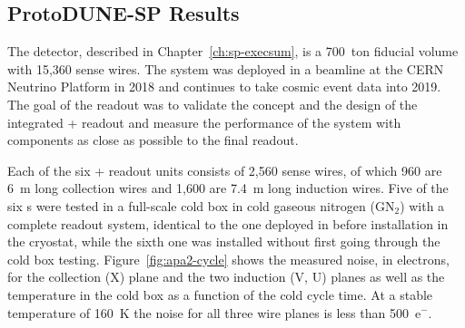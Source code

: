 \subsection{ProtoDUNE-SP Results}
\label{sec:fdsp-tpcelec-overview-pdune}

The %
detector, described 
in Chapter~\ref{ch:sp-execsum}, is a 700~ton fiducial volume 
 with 15,360 sense wires. 
The system was deployed in a beamline at the CERN Neutrino Platform 
in 2018 and continues to take cosmic event data into 2019. The goal of 
the   readout was to validate the concept 
and the design of the integrated + readout 
and measure the performance of the  system with components 
as close as possible to the final   readout.

Each of the six  +
readout units consists of 2,560 sense wires, of which 960 are \SI{6}{m} 
long collection wires and 1,600 are \SI{7.4}{m} long induction wires. 
Five of the six s were tested in a full-scale cold box in 
cold gaseous nitrogen (GN$_2$) with a complete  readout system,  
identical to the one %
deployed in  before installation in the cryostat,
while the sixth one was installed without first going through the cold
box testing. Figure~\ref{fig:apa2-cycle} shows the measured noise, in 
electrons, for the collection (X) plane and the two induction (V, U) 
planes as well as the  temperature in the cold box as a 
function of the cold cycle time. At a stable temperature of 
\SI{160}{K} the noise for all three wire planes is less than 500~e$^-$.

